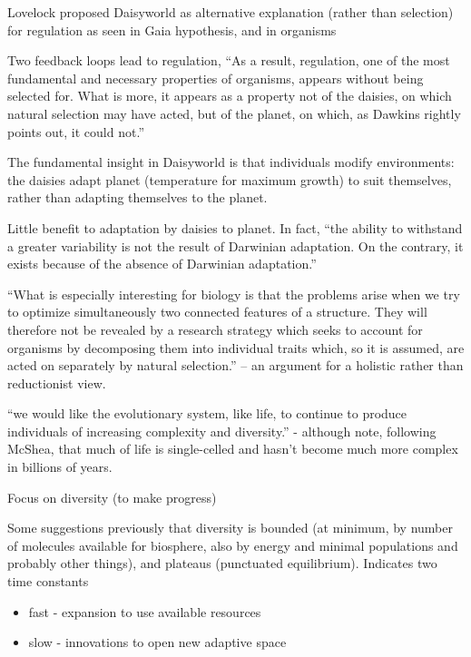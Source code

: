 	
	Lovelock proposed Daisyworld as alternative explanation (rather than
	selection) for regulation as seen in Gaia hypothesis, and in organisms
	

	Two feedback loops lead to regulation, ``As a result, regulation, one
	of the most fundamental and necessary properties of organisms, appears
	without being selected for. What is more, it appears as a property not
	of the daisies, on which natural selection may have acted, but of the
	planet, on which, as Dawkins rightly points out, it could not.''
	
	
	The fundamental insight in Daisyworld is that individuals modify environments: the daisies adapt planet (temperature for maximum growth) to suit themselves, rather than adapting themselves to the planet.
	
	Little benefit to adaptation by daisies to planet. In fact, ``the
	ability to withstand a greater variability is not the result of
	Darwinian adaptation. On the contrary, it exists because of the
	absence of Darwinian adaptation.''

	``What is especially interesting for biology is that the problems
	arise when we try to optimize simultaneously two connected features of
	a structure. They will therefore not be revealed by a research
	strategy which seeks to account for organisms by decomposing them into
	individual traits which, so it is assumed, are acted on separately by
	natural selection.'' -- an argument for a holistic rather than reductionist view.

\autocite{Maley1999}

	``we would like the evolutionary system, like life, to continue to
	produce individuals of increasing complexity and diversity.'' -
	although note, following McShea, that much of life is single-celled
	and hasn't become much more complex in billions of years.

	
	Focus on diversity (to make progress)
	
	
	Some suggestions previously that diversity is bounded (at minimum, by
	number of molecules available for biosphere, also by energy and
	minimal populations and probably other things), and plateaus
	(punctuated equilibrium). Indicates two time constants
	
	
	\begin{itemize}
		\item
		
		fast - expansion to use available resources
		
		\item
		
		slow - innovations to open new adaptive space
		
	\end{itemize}

